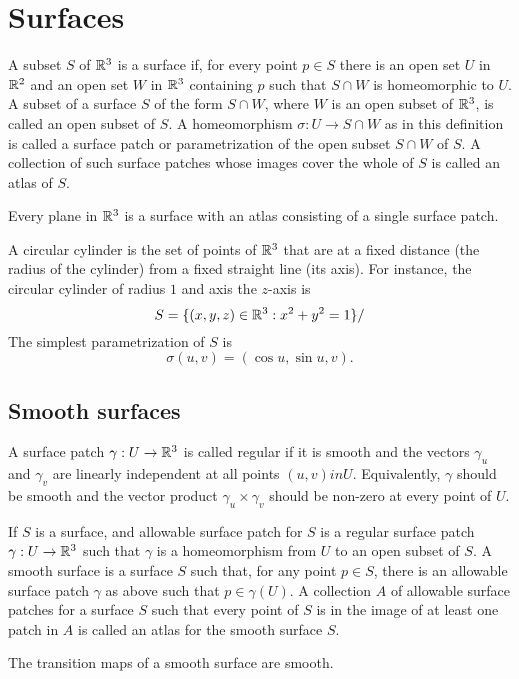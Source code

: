 \section{Surfaces}

\begin{defn}
  A subset $S$ of $\mathbb{R}^3$ is a surface if, for every point $p \in S$
  there is an open set $U$ in $\mathbb{R}^2$ and an open set $W$ in $\mathbb{R}^3$
  containing $p$ such that $S \cap W$ is homeomorphic to $U$.
  A subset of a surface $S$ of the form $S \cap W$, where $W$
  is an open subset of $\mathbb{R}^3$, is called an open subset of $S$.
  A homeomorphism $\sigma: U \to S \cap W$ as in this definition
  is called a surface patch or parametrization of
  the open subset $S \cap W$ of $S$.
  A collection of such surface patches whose images cover the
  whole of $S$ is called an atlas of $S$.
\end{defn}

\begin{example}
  Every plane in $\mathbb{R}^3$ is a surface with an atlas consisting of a single surface patch.
\end{example}

\begin{example}
  A circular cylinder is the set of points of $\mathbb{R}^3$ that are at a fixed distance
  (the radius of the cylinder) from a fixed straight line (its axis).
  For instance, the circular cylinder of radius $1$ and axis the $z$-axis is
  \[
    S = \{(x, y, z) \in \mathbb{R}^3 : x^2 + y^2 = 1\}/
  \]
  The simplest parametrization of $S$ is 
  \[
    \sigma(u, v) = (\cos u, \sin u, v).
  \]
\end{example}


\subsection{Smooth surfaces}

\begin{defn}
  A surface patch $\gamma: U \to \mathbb{R}^3$ is called regular if
  it is smooth and the vectors $\gamma_u$ and $\gamma_v$ are
  linearly independent at all points $(u, v) in U$.
  Equivalently, $\gamma$ should be smooth and the vector
  product $\gamma_u \times \gamma_v$ should be non-zero at every point of $U$.
\end{defn}

\begin{defn}
  If $S$ is a surface, and allowable surface patch for $S$ is a regular
  surface patch $\gamma: U \to \mathbb{R}^3$ such that $\gamma$ is a
  homeomorphism from $U$ to an open subset of $S$.
  A smooth surface is a surface $S$ such that, for any point $p \in S$,
  there is an allowable surface patch $\gamma$ as above such that $p \in \gamma(U)$.
  A collection $A$ of allowable surface patches for a surface $S$ such that
  every point of $S$ is in the image of at least one patch in $A$
  is called an atlas for the smooth surface $S$.
\end{defn}

\begin{proposition}
  The transition maps of a smooth surface are smooth.
\end{proposition}
